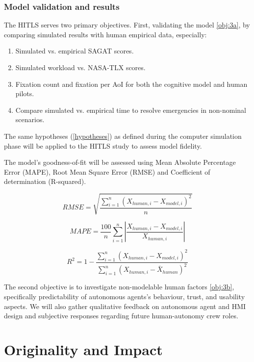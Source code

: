 \documentclass[12pt,a4paper]{article} %
\begin{document}
	\subsubsection{Model validation and results}
	The HITLS serves two primary objectives. First, validating the model \ref{obj:3a}, by comparing simulated results with human empirical data, especially:
	\begin{enumerate}
		\item Simulated vs. empirical SAGAT scores.
		\item Simulated workload vs. NASA-TLX scores.
		\item Fixation count and fixation per AoI for both the cognitive model and human pilots.
		\item Compare simulated vs. empirical time to resolve emergencies in non-nominal scenarios. 
	\end{enumerate}
	The same hypotheses (\ref{hypotheses}) as defined during the computer simulation phase will be applied to the HITLS study to assess model fidelity. 

	The model's goodness-of-fit will be assessed using Mean Absolute Percentage Error (MAPE), Root Mean Square Error (RMSE) and Coefficient of determination (R-squared).

	\begin{equation}
		RMSE = \sqrt{\frac{\sum_{i=1}^{n} \left(X_{human,i}-X_{model,i}\right)^2}{n} } 
	\end{equation}

	\begin{equation}
		MAPE = \frac{100}{n} \sum_{i=1}^{n} \left\lvert \frac{X_{human,i} - X_{model,i}}{X_{human,i}} \right\rvert 
	\end{equation}

	\begin{equation}
		R^2 = 1 - \frac{\sum_{i=1}^{n} (X_{human,i} - X_{model,i})^2}{\sum_{i=1}^{n} (X_{human,i} - \bar{X}_{human})^2}
	\end{equation}

	The second objective is to investigate non-modelable human factors \ref{obj:3b}, specifically predictability of autonomous agents's behaviour, trust, and usability aspects. We will also gather qualitative feedback on autonomous agent and HMI design and subjective responses regarding future human-autonomy crew roles.
	
	\section{Originality and Impact}
\end{document}
